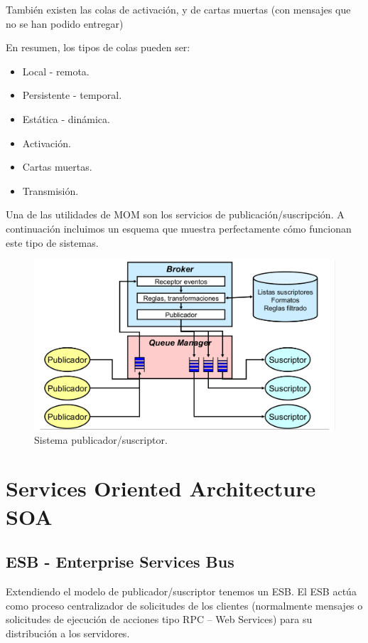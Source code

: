 \documentclass{apuntes}[nochap]
\begin{document}
También existen las colas de activación, y de cartas muertas (con mensajes que no se han podido entregar)


En resumen, los tipos de colas pueden ser:
\begin{itemize}
	\item Local - remota.
	\item Persistente - temporal.
	\item Estática - dinámica.
	\item Activación.
	\item Cartas muertas.
	\item Transmisión.
\end{itemize}

\begin{example}
Una de las utilidades de MOM son los servicios de publicación/suscripción. A continuación incluimos un esquema que muestra perfectamente cómo funcionan este tipo de sistemas.


\begin{figure}[hbtp]
\centering
\includegraphics[width=1\textwidth]{img/PubSusc.png}
\caption{Sistema publicador/suscriptor.}
\label{PubSusc}
\end{figure}
\newpage
\end{example}


\section{Services Oriented Architecture SOA}
\subsection{ESB - Enterprise Services Bus}

Extendiendo el modelo de publicador/suscriptor tenemos un ESB. El ESB actúa como proceso centralizador de solicitudes de los clientes (normalmente mensajes o solicitudes de ejecución de acciones tipo RPC – Web Services) para su distribución a los servidores.
\end{document}
